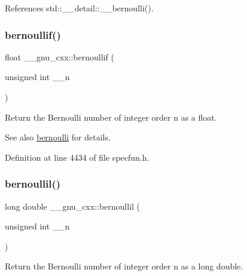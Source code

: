 References std\+::\+\_\+\+\_\+detail\+::\+\_\+\+\_\+bernoulli().

\mbox{\label{group__mathsf__gnu_gabcd77f012ae74989c4bb9ca61978481d}} 
\subsubsection{\texorpdfstring{bernoullif()}{bernoullif()}}
{\footnotesize\ttfamily float \+\_\+\+\_\+gnu\+\_\+cxx\+::bernoullif (\begin{DoxyParamCaption}\item[{unsigned int}]{\+\_\+\+\_\+n }\end{DoxyParamCaption})\hspace{0.3cm}{\ttfamily [inline]}}

Return the Bernoulli number of integer order {\ttfamily n} as a {\ttfamily float}.

\begin{DoxySeeAlso}{See also}
\hyperlink{group__mathsf__gnu_gad339f0011df1967ec6c9e55bd1547bf4}{bernoulli} for details. 
\end{DoxySeeAlso}


Definition at line 4434 of file specfun.\+h.

\mbox{\label{group__mathsf__gnu_gaac8f04abfdd6b744d11cb73ec1f564b1}} 
\subsubsection{\texorpdfstring{bernoullil()}{bernoullil()}}
{\footnotesize\ttfamily long double \+\_\+\+\_\+gnu\+\_\+cxx\+::bernoullil (\begin{DoxyParamCaption}\item[{unsigned int}]{\+\_\+\+\_\+n }\end{DoxyParamCaption})\hspace{0.3cm}{\ttfamily [inline]}}

Return the Bernoulli number of integer order {\ttfamily n} as a {\ttfamily long double}.

